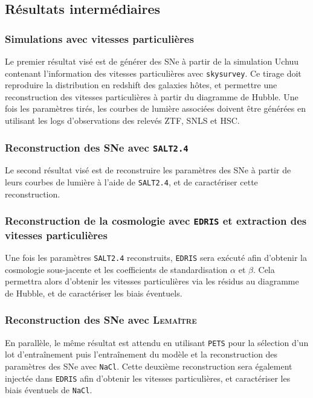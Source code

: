 \documentclass{book}
\def\lemaitre{\textsc{Lemaître}\xspace}
\def\skysurvey{\texttt{skysurvey}\xspace}
\def\pets{\texttt{PETS}\xspace}
\def\nacl{\texttt{NaCl}\xspace}
\def\edris{\texttt{EDRIS}\xspace}
\def\saltd{\texttt{SALT2.4}\xspace}
\begin{document}
\subsection{Résultats intermédiaires}

\subsubsection{Simulations avec vitesses particulières}

Le premier résultat visé est de générer des SNe à partir de la simulation Uchuu contenant l'information des vitesses particulières avec \skysurvey. Ce tirage doit reproduire la distribution en redshift des galaxies hôtes, et permettre une reconstruction des vitesses particulières à partir du diagramme de Hubble. Une fois les paramètres tirés, les courbes de lumière associées doivent être générées en utilisant les logs d'observations des relevés ZTF, SNLS et HSC.

\subsubsection{Reconstruction des SNe avec \saltd}

Le second résultat visé est de reconstruire les paramètres des SNe à partir de leurs courbes de lumière à l'aide de \saltd, et de caractériser cette reconstruction.

\subsubsection{Reconstruction de la cosmologie avec \edris et extraction des vitesses particulières}

Une fois les paramètres \saltd reconstruits, \edris sera exécuté afin d'obtenir la cosmologie sous-jacente et les coefficients de standardisation $\alpha$ et $\beta$.
Cela permettra alors d'obtenir les vitesses particulières via les résidus au diagramme de Hubble, et de caractériser les biais éventuels.

\subsubsection{Reconstruction des SNe avec \lemaitre}

En parallèle, le même résultat est attendu en utilisant \pets pour la sélection d'un lot d'entraînement puis l'entraînement du modèle et la reconstruction des paramètres des SNe avec \nacl. Cette deuxième reconstruction sera également injectée dans \edris afin d'obtenir les vitesses particulières, et caractériser les biais éventuels de \nacl.
\end{document}
